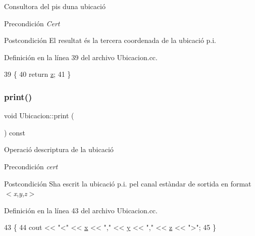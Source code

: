 Consultora del pis d\textquotesingle{}una ubicació 

\begin{DoxyPrecond}{Precondición}
{\itshape Cert} 
\end{DoxyPrecond}
\begin{DoxyPostcond}{Postcondición}
El resultat és la tercera coordenada de la ubicació p.\+i. 
\end{DoxyPostcond}


Definición en la línea 39 del archivo Ubicacion.\+cc.


\begin{DoxyCode}
39                               \{
40   \textcolor{keywordflow}{return} \hyperlink{class_ubicacion_ad74770f35bf4b18d3959b78cd90b6eb0}{z};
41 \}
\end{DoxyCode}
\mbox{\label{class_ubicacion_a6b693a32d8bbd9afce30b11d19b68846}} 
\subsubsection{\texorpdfstring{print()}{print()}}
{\footnotesize\ttfamily void Ubicacion\+::print (\begin{DoxyParamCaption}{ }\end{DoxyParamCaption}) const}



Operació d\textquotesingle{}escriptura de la ubicació 

\begin{DoxyPrecond}{Precondición}
{\itshape cert} 
\end{DoxyPrecond}
\begin{DoxyPostcond}{Postcondición}
S\textquotesingle{}ha escrit la ubicació p.\+i. pel canal estàndar de sortida en format $<${\itshape x},{\itshape y},{\itshape z}$>$ 
\end{DoxyPostcond}


Definición en la línea 43 del archivo Ubicacion.\+cc.


\begin{DoxyCode}
43                             \{
44   cout << \textcolor{stringliteral}{"<"} << \hyperlink{class_ubicacion_aa025967df0ca8761587b09a38cf5b798}{x} << \textcolor{stringliteral}{","} << \hyperlink{class_ubicacion_ab314f05b8da651aabb8a623467919a94}{y} << \textcolor{stringliteral}{","} << \hyperlink{class_ubicacion_ad74770f35bf4b18d3959b78cd90b6eb0}{z} << \textcolor{stringliteral}{">"};
45 \}
\end{DoxyCode}
\mbox{\label{class_ubicacion_ac88191686dfc11998ec6688828b52b9f}} 
